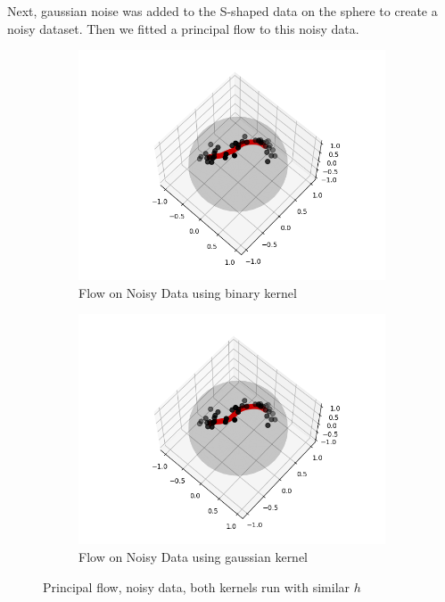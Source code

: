 \documentclass[12pt]{report}
\begin{document}
Next, gaussian noise was added to the S-shaped data on the sphere to create a noisy dataset.
Then we fitted a principal flow to this noisy data.
\begin{figure}[ht]
\centering
\begin{subfigure}{.5\textwidth}
    \centering
    \includegraphics[scale=0.5]{noisy_13_binary.png}
    \caption{Flow on Noisy Data using binary kernel}
    \label{noisybinary}
\end{subfigure}%
\begin{subfigure}{.5\textwidth}
    \centering
    \includegraphics[scale=0.5]{noisy_13_gaussian.png}
    \caption{Flow on Noisy Data using gaussian kernel}
    \label{noisygaussian}
\end{subfigure}
\caption{Principal flow, noisy data, both kernels run with similar $h$}
\label{fig:noisyflows}
\end{figure}
\end{document}
